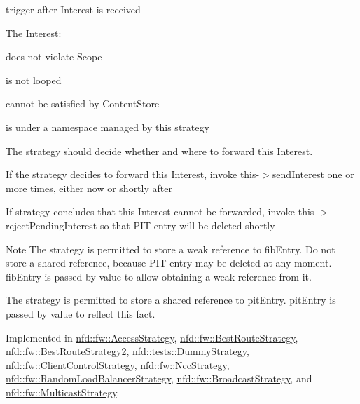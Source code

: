trigger after Interest is received 

The Interest\+:
\begin{DoxyItemize}
\item does not violate Scope
\item is not looped
\item cannot be satisfied by Content\+Store
\item is under a namespace managed by this strategy
\end{DoxyItemize}

The strategy should decide whether and where to forward this Interest.
\begin{DoxyItemize}
\item If the strategy decides to forward this Interest, invoke this-\/$>$send\+Interest one or more times, either now or shortly after
\item If strategy concludes that this Interest cannot be forwarded, invoke this-\/$>$reject\+Pending\+Interest so that P\+IT entry will be deleted shortly
\end{DoxyItemize}

\begin{DoxyNote}{Note}
The strategy is permitted to store a weak reference to fib\+Entry. Do not store a shared reference, because P\+IT entry may be deleted at any moment. fib\+Entry is passed by value to allow obtaining a weak reference from it. 

The strategy is permitted to store a shared reference to pit\+Entry. pit\+Entry is passed by value to reflect this fact. 
\end{DoxyNote}


Implemented in \hyperlink{classnfd_1_1fw_1_1AccessStrategy_a0ca5163bd045d0c015255c8c97849144}{nfd\+::fw\+::\+Access\+Strategy}, \hyperlink{classnfd_1_1fw_1_1BestRouteStrategy_a85bc7a6cf35dd45793c616e89182b298}{nfd\+::fw\+::\+Best\+Route\+Strategy}, \hyperlink{classnfd_1_1fw_1_1BestRouteStrategy2_a54c18bf6a066cac59b1edd5ddcfd2c19}{nfd\+::fw\+::\+Best\+Route\+Strategy2}, \hyperlink{classnfd_1_1tests_1_1DummyStrategy_aa558372004fd24efc2debd5e329e2af9}{nfd\+::tests\+::\+Dummy\+Strategy}, \hyperlink{classnfd_1_1fw_1_1ClientControlStrategy_ad1ed942efc1fb9d8578448888365f894}{nfd\+::fw\+::\+Client\+Control\+Strategy}, \hyperlink{classnfd_1_1fw_1_1NccStrategy_af2615219a128332ad6582293a3614b6e}{nfd\+::fw\+::\+Ncc\+Strategy}, \hyperlink{classnfd_1_1fw_1_1RandomLoadBalancerStrategy_adedc4af590bd05f720a556e033ee2e45}{nfd\+::fw\+::\+Random\+Load\+Balancer\+Strategy}, \hyperlink{classnfd_1_1fw_1_1BroadcastStrategy_a08823b7058a224203f7ddc3c32203e50}{nfd\+::fw\+::\+Broadcast\+Strategy}, and \hyperlink{classnfd_1_1fw_1_1MulticastStrategy_a3dede97a8433b762348568de7d7ae122}{nfd\+::fw\+::\+Multicast\+Strategy}.


